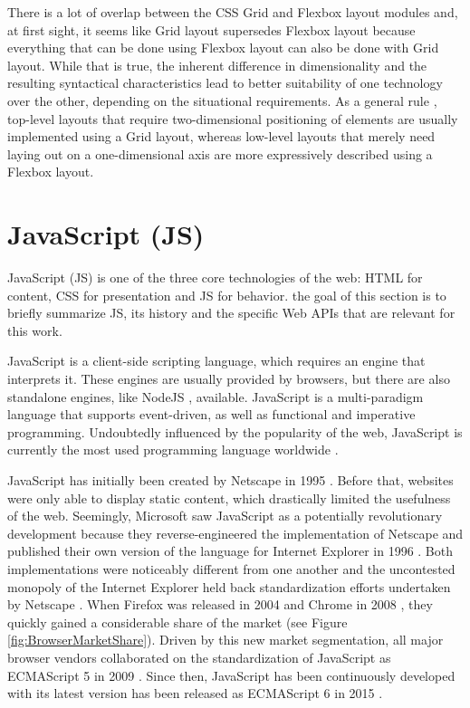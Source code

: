 There is a lot of overlap between the CSS Grid and Flexbox layout modules and, at first sight, it seems like Grid layout supersedes Flexbox layout because everything that can be done using Flexbox layout can also be done with Grid layout. 
While that is true, the inherent difference in dimensionality and the resulting syntactical characteristics lead to better suitability of one technology over the other, depending on the situational requirements. 
As a general rule \parencite{CSSGridVsFlexbox}, top-level layouts that require two-dimensional positioning of elements are usually implemented using a Grid layout, whereas low-level layouts that merely need laying out on a one-dimensional axis are more expressively described using a Flexbox layout.

\section{JavaScript (JS)}
\label{sec:JS}

JavaScript (JS) is one of the three core technologies of the web: HTML for content, CSS for presentation and JS for behavior. 
the goal of this section is to briefly summarize JS, its history and the specific Web APIs that are relevant for this work.

JavaScript is a client-side scripting language, which requires an engine that interprets it. 
These engines are usually provided by browsers, but there are also standalone engines, like NodeJS \parencite{NodeJS}, available. 
JavaScript is a multi-paradigm language that supports event-driven, as well as functional and imperative programming.
Undoubtedly influenced by the popularity of the web, JavaScript is currently the most used programming language worldwide \parencite{StatisticProgrammingLanguageUsage}.

JavaScript has initially been created by Netscape in 1995 \parencite{JSFirstRelease}.
Before that, websites were only able to display static content, which drastically limited the usefulness of the web. 
Seemingly, Microsoft saw JavaScript as a potentially revolutionary development because they reverse-engineered the implementation of Netscape and published their own version of the language for Internet Explorer in 1996 \parencite{JSIERelease}. 
Both implementations were noticeably different from one another and the uncontested monopoly of the Internet Explorer \parencite{BrowserMarketShareEarly} held back standardization efforts undertaken by Netscape \parencite{ECMAScript1}. 
When Firefox was released in 2004 \parencite{FirefoxFirstRelease} and Chrome in 2008 \parencite{ChromeFirstRelease}, they quickly gained a considerable share of the market \parencite{BrowserMarketShare} (see Figure \ref{fig:BrowserMarketShare}).
Driven by this new market segmentation, all major browser vendors collaborated on the standardization of JavaScript as ECMAScript 5 in 2009 \parencite{ECMAScript5}. 
Since then, JavaScript has been continuously developed with its latest version has been released as ECMAScript 6 in 2015 \parencite{ECMAScript6}.

